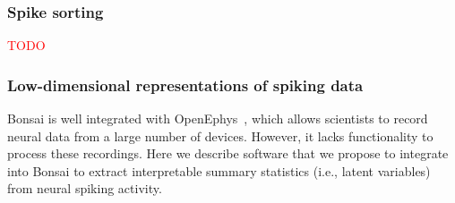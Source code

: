 \documentclass[a4paper,11point]{article}
\begin{document}
\subsubsection{Spike sorting}
\label{sec:spikeSorting}

\noindent\textcolor{red}{TODO}

\subsubsection{Low-dimensional representations of spiking data}
\label{sec:lowDimensionalRepresentationsOfSpikingData}

Bonsai is well integrated with OpenEphys~\citep{siegleEtAl17}, which allows
scientists to record neural data from a large number of devices. However, it
lacks functionality to process these recordings. Here we describe software that
we propose to integrate into Bonsai to extract interpretable summary statistics
(i.e., latent variables) from neural spiking activity.
\end{document}
